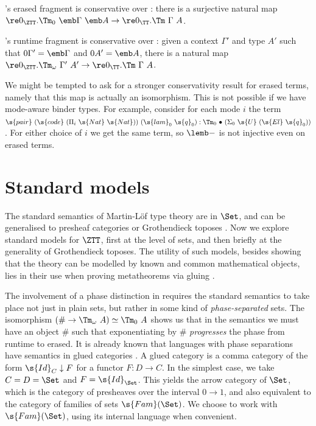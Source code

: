 \documentclass[a4paper,UKenglish,cleveref,autoref,thm-restate]{lipics-v2021}
\begin{document}
\begin{theorem}\label{thm:erased-cons}
  \ZTT's erased fragment is conservative over \TT: there is a surjective natural map
  $\re 0_{\ZTT}.\Tm_0\ \emb \Gamma\ \emb A \to \re 0_\TT.\Tm\ \Gamma\ A$.
\end{theorem}

\begin{corollary}\label{thm:rt-cons}
  \ZTT's runtime fragment is conservative over \TT: given a \ZTT context $\Gamma'$
  and type $A'$ such that $0\Gamma' = \emb \Gamma$ and $0A' = \emb A$, there is a natural map
  $\re 0_{\ZTT}.\Tm_\omega\ \Gamma'\ A' \to \re 0_\TT.\Tm\ \Gamma\ A$.
\end{corollary}

We might be tempted to ask for a stronger conservativity result for erased
terms, namely that this map is actually an isomorphism. This is not possible if
we have mode-aware binder types. For example, consider for each mode $i$ the
term $\s{pair}\ (\s{code}\ (\Pi_i\ \s{Nat}\ \s{Nat}))\ (\s{lam}_0\ \s{q}_0) :
\Tm_0\ {\bullet}\ (\Sigma_0\ \s{U}\ (\s{El}\ \s{q}_0))$. For either choice of
$i$ we get the same \TT term, so $\lemb-$ is not injective even on erased terms.

\section{Standard models} \label{ssub:std-model}

The standard semantics of Martin-L\"of type theory are in $\Set$, and can be
generalised to presheaf categories \cite{Hofmann1997-on} or Grothendieck toposes
\cite{Gratzer2022-gn}. Now we explore standard models for $\ZTT$, first at the
level of sets, and then briefly at the generality of Grothendieck toposes.
The utility of such models, besides showing that the theory can be modelled by known
and common mathematical objects, lies in their use when proving metatheorems
via gluing \cite{Kaposi2019-lp}.

The involvement of a phase distinction in \ZTT requires the standard semantics
to take place not just in plain sets, but rather in some kind of
\emph{phase-separated} sets. The isomorphism $(\# \to \Tm_\omega\ A) \simeq
\Tm_0\ A$ shows us that in the semantics we must have an object $\#$ such that
exponentiating by $\#$ \emph{progresses} the phase from runtime to erased. It is
already known that languages with phase separations have semantics in
glued categories \cite{Sterling2022-ym}. A glued category is a comma category of
the form $\s{Id}_C \downarrow F$ for a functor $F : D \to C$. In the simplest
case, we take $C = D = \Set$ and $F = \s{Id}_{\Set}$. This yields the arrow
category of $\Set$, which is the category of presheaves over the interval $0 \to
1$, and also equivalent to the category of families of sets $\s{Fam}(\Set)$.
We choose to work with $\s{Fam}(\Set)$, using its internal language when convenient.
\end{document}
